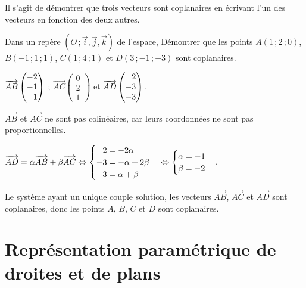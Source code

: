 \documentclass{cornouaille}
\begin{document}
\begin{methode*1}

  Il s'agit de démontrer que trois vecteurs sont coplanaires en
  écrivant l'un des vecteurs en fonction des deux autres.

  \exercice 

  Dans un repère $(O\,;\vec{i},\vec{j},\vec{k})$ de l'espace, Démontrer
  que les points $A(1\,;2\,;0)$, $B(-1\,;1\,;1)$, $C(1\,;4\,;1)$ et $D(3\,;-1\,;-3)$
  sont coplanaires.

  \correction

  $\overrightarrow{AB} 
  \begin{pmatrix} 
    -2\\
    -1\\
    \hphantom{-}1
  \end{pmatrix}$ ; $\overrightarrow{AC} \begin{pmatrix} 0\\2\\1
  \end{pmatrix}$ et $\overrightarrow{AD} \begin{pmatrix} \hphantom{-}2\\-3\\-3
  \end{pmatrix}$.

  $\overrightarrow{AB}$ et $\overrightarrow{AC}$ ne sont pas
  colinéaires, car leurs coordonnées ne sont pas proportionnelles.

  $\overrightarrow{AD}=\alpha\overrightarrow{AB}+\beta\overrightarrow{AC}\Leftrightarrow%
  \begin{cases}
    \hphantom{-}2=-2\alpha\\
    -3=-\alpha+2\beta\\
    -3=\alpha+\beta
  \end{cases}\Leftrightarrow
  \begin{cases}
    \alpha=-1\\
    \beta=-2
  \end{cases}$.

  Le système ayant un unique couple solution, les vecteurs
  $\overrightarrow{AB}$, $\overrightarrow{AC}$ et
  $\overrightarrow{AD}$ sont coplanaires, donc les points $A$, $B$,
  $C$ et $D$ sont coplanaires.
\end{methode*1}

\section{Représentation paramétrique de droites et de plans}
\end{document}
